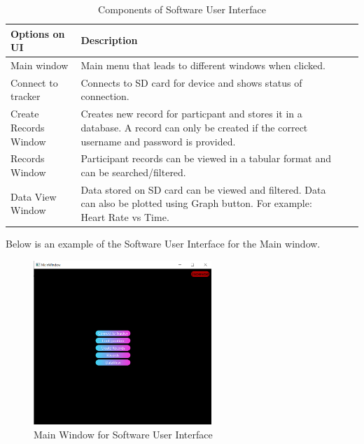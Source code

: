 \documentclass[12pt, titlepage]{article}
\begin{document}
\begin{table}[H]
	\begin{tabularx}{1.05\textwidth} { 
		  | >{\centering\arraybackslash}X 
		  | >{\centering\arraybackslash}X 
		  | >{\centering\arraybackslash}X 
		  | >{\centering\arraybackslash}X | }
		 \hline
		 \textbf{Options on UI} & \textbf{Description}\\
		 \hline
		Main window & Main menu that leads to different windows when clicked.\\
		\hline
		 Connect to tracker  & Connects to SD card for device and shows status of connection.\\
		 \hline
		   Create Records Window & Creates new record for particpant and stores it in a database. A record can only be created if the correct username and password is provided. \\
		\hline 
		Records Window & Participant records can be viewed in a tabular format and can be searched/filtered.\\
		\hline
		Data View Window & Data stored on SD card can be viewed and filtered. Data can also be plotted using Graph button. For example: Heart Rate vs Time.\\
		\hline
	\end{tabularx}
\caption{\label{Software User Interface}Components of Software User Interface}  
\end{table}

Below is an example of the Software User Interface for the Main window.
\begin{figure}[H]
	\begin{center}
		 \includegraphics[width=0.6\textwidth]{MainWindow}
		\caption{Main Window for Software User Interface}
		\label{MainWindow} 
	\end{center}
\end{figure}
\end{document}
